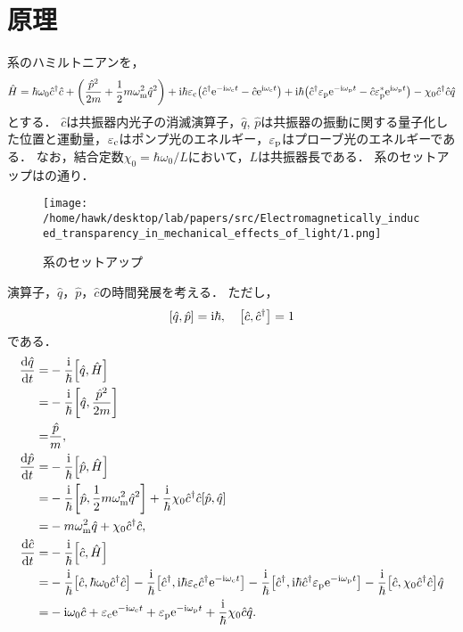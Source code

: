     \section{原理}
      系のハミルトニアンを，
      \begin{align}
        \hat{H} = \hbar\omega_0\hat{c}^{\dag}\hat{c} + \qty(\frac{\hat{p}^2}{2m} + \frac{1}{2}m\omega^2_{\mathrm{m}}\hat{q}^2) + \mathrm{i}\hbar\varepsilon_{\mathrm{c}}\qty(\hat{c}^{\dag}\mathrm{e}^{-\mathrm{i}\omega_{\mathrm{c}}t} - \hat{c}\mathrm{e}^{\mathrm{i}\omega_{\mathrm{c}}t}) + \mathrm{i}\hbar\qty(\hat{c}^{\dag}\varepsilon_{\mathrm{p}}\mathrm{e}^{-\mathrm{i}\omega_{\mathrm{p}}t} - \hat{c}\varepsilon^*_{\mathrm{p}}\mathrm{e}^{\mathrm{i}\omega_{\mathrm{p}}t}) - \chi_0\hat{c}^{\dag}\hat{c}\hat{q}
      \end{align}
      とする．
      $\hat{c}$は共振器内光子の消滅演算子，$\hat{q}$, $\hat{p}$は共振器の振動に関する量子化した位置と運動量，$\varepsilon_{\mathrm{c}}$はポンプ光のエネルギー，$\varepsilon_{\mathrm{p}}$はプローブ光のエネルギーである．
      なお，結合定数$\chi_0 = \hbar\omega_0 / L$において，$L$は共振器長である．
      系のセットアップはの通り．
      \begin{figure}[H]
        \centering
        \texttt{[image: /home/hawk/desktop/lab/papers/src/Electromagnetically\_induced\_transparency\_in\_mechanical\_effects\_of\_light/1.png]}
        \caption{系のセットアップ}\label{PhysRevA.81.041803-fig-1}
      \end{figure}
      演算子，$\hat{q}$，$\hat{p}$，$\hat{c}$の時間発展を考える．
      ただし，
      \begin{align}
        \qty[\hat{q}, \hat{p}] = \mathrm{i}\hbar,\quad \qty[\hat{c}, \hat{c}^{\dag}] = 1
      \end{align}
      である．
      \begin{align}
        \dv{\hat{q}}{t} =& -\frac{\mathrm{i}}{\hbar}\qty[\hat{q}, \hat{H}] \\ 
        =& -\frac{\mathrm{i}}{\hbar}\qty[\hat{q}, \frac{\hat{p}^2}{2m}] \\ 
        =& \frac{\hat{p}}{m}, \\ 
        \dv{\hat{p}}{t} =& -\frac{\mathrm{i}}{\hbar}\qty[\hat{p}, \hat{H}] \\ 
        =& -\frac{\mathrm{i}}{\hbar}\qty[\hat{p}, \frac{1}{2}m\omega^2_{\mathrm{m}}\hat{q}^2] + \frac{\mathrm{i}}{\hbar}\chi_0\hat{c}^{\dag}\hat{c}\qty[\hat{p}, \hat{q}] \\ 
        =& -m\omega^2_{\mathrm{m}}\hat{q} + \chi_0\hat{c}^{\dag}\hat{c}, \label{PhysRevA.81.041803-eom-p} \\ 
        \dv{\hat{c}}{t} =& -\frac{\mathrm{i}}{\hbar}\qty[\hat{c}, \hat{H}] \\ 
        =& -\frac{\mathrm{i}}{\hbar}\qty[\hat{c}, \hbar\omega_0\hat{c}^{\dag}\hat{c}] - \frac{\mathrm{i}}{\hbar}\qty[\hat{c}^{\dag}, \mathrm{i}\hbar\varepsilon_{\mathrm{c}}\hat{c}^{\dag}\mathrm{e}^{-\mathrm{i}\omega_{\mathrm{c}}t}] - \frac{\mathrm{i}}{\hbar}\qty[\hat{c}^{\dag}, \mathrm{i}\hbar\hat{c}^{\dag}\varepsilon_{\mathrm{p}}\mathrm{e}^{-\mathrm{i}\omega_{\mathrm{p}}t}] - \frac{\mathrm{i}}{\hbar}\qty[\hat{c}, \chi_0\hat{c}^{\dag}\hat{c}]\hat{q} \\ 
        =& -\mathrm{i}\omega_0\hat{c} + \varepsilon_{\mathrm{c}}\mathrm{e}^{-\mathrm{i}\omega_{\mathrm{c}}t} + \varepsilon_{\mathrm{p}}\mathrm{e}^{-\mathrm{i}\omega_{\mathrm{p}}t} + \frac{\mathrm{i}}{\hbar}\chi_0\hat{c}\hat{q}\label{PhysRevA.81.041803-eom-c-1}.
      \end{align}
